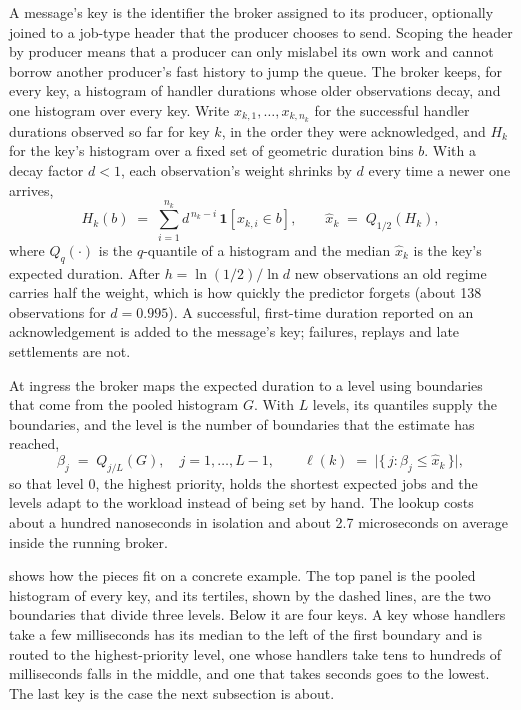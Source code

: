 A message's key is the identifier the broker assigned to its producer, optionally joined to a job-type header that the producer chooses to send. Scoping the header by
producer means that a producer can only mislabel its own work and cannot borrow another producer's fast history to jump the queue. The broker keeps, for every
key, a histogram of handler durations whose older observations decay, and one histogram over every key. Write $x_{k,1},\dots,x_{k,n_k}$ for the successful handler
durations observed so far for key $k$, in the order they were acknowledged, and $H_k$ for the key's histogram over a fixed set of geometric duration bins $b$. With a
decay factor $d<1$, each observation's weight shrinks by $d$ every time a newer one arrives,
\begin{equation}
  H_k(b) \;=\; \sum_{i=1}^{n_k} d^{\,n_k-i}\,\mathbf{1}\!\left[x_{k,i}\in b\right],
  \qquad
  \hat{x}_k \;=\; Q_{1/2}(H_k),
  \label{eq:histogram}
\end{equation}
where $Q_q(\cdot)$ is the $q$-quantile of a histogram and the median $\hat{x}_k$ is the key's expected duration. After $h=\ln(1/2)/\ln d$ new observations an old regime
carries half the weight, which is how quickly the predictor forgets (about 138 observations for $d=0.995$). A successful, first-time duration reported on an acknowledgement is
added to the message's key; failures, replays and late settlements are not.

At ingress the broker maps the expected duration to a level using boundaries that come from the pooled histogram $G$. With $L$ levels, its quantiles supply the
boundaries, and the level is the number of boundaries that the estimate has reached,
\begin{equation}
  \beta_j \;=\; Q_{j/L}(G),\quad j=1,\dots,L-1,
  \qquad
  \ell(k) \;=\; \bigl|\{\,j : \beta_j \le \hat{x}_k\,\}\bigr|,
  \label{eq:level}
\end{equation}
so that level $0$, the highest priority, holds the shortest expected jobs and the levels adapt to the workload instead of being set by hand. The lookup costs about a hundred
nanoseconds in isolation and about 2.7 microseconds on average inside the running broker.

 shows how the pieces fit on a concrete example. The top panel is the pooled histogram of every key, and its tertiles, shown by the dashed lines, are the two
boundaries that divide three levels. Below it are four keys. A key whose handlers take a few milliseconds has its median to the left of the first boundary and is routed to the
highest-priority level, one whose handlers take tens to hundreds of milliseconds falls in the middle, and one that takes seconds goes to the lowest. The last key is the case the next
subsection is about.

